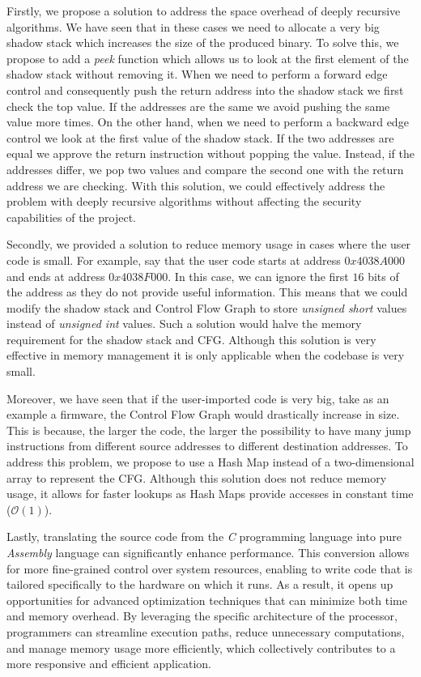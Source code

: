 Firstly, we propose a solution to address the space overhead of deeply recursive
algorithms. We have seen that in these cases we need to allocate a very big shadow
stack which increases the size of the produced binary. To solve this, we propose
to add a \textit{peek} function which allows us to look at the first element of
the shadow stack without removing it. When we need to perform a forward edge control
and consequently push the return address into the shadow stack we first check the
top value. If the addresses are the same we avoid pushing the same value more
times. On the other hand, when we need to perform a backward edge control we
look at the first value of the shadow stack. If the two addresses are equal we approve
the return instruction without popping the value. Instead, if the addresses differ,
we pop two values and compare the second one with the return address we are
checking. With this solution, we could effectively address the problem with
deeply recursive algorithms without affecting the security capabilities of the
project.

Secondly, we provided a solution to reduce memory usage in cases where the user code
is small. For example, say that the user code starts at address $0x4038A000$ and
ends at address $0x4038F000$. In this case, we can ignore the first $16$ bits of
the address as they do not provide useful information. This means that we could
modify the shadow stack and Control Flow Graph to store \textit{unsigned short} values
instead of \textit{unsigned int} values. Such a solution would halve the memory requirement
for the shadow stack and CFG. Although this solution is very effective in memory
management it is only applicable when the codebase is very small.

Moreover, we have seen that if the user-imported code is very big, take as an
example a firmware, the Control Flow Graph would drastically increase in size.
This is because, the larger the code, the larger the possibility to have many
jump instructions from different source addresses to different destination
addresses. To address this problem, we propose to use a Hash Map instead of a
two-dimensional array to represent the CFG. Although this solution does not reduce
memory usage, it allows for faster lookups as Hash Maps provide accesses in
constant time ($\mathcal{O}(1)$).

Lastly, translating the source code from the \textit{C} programming language
into pure \textit{Assembly} language can significantly enhance performance. This
conversion allows for more fine-grained control over system resources, enabling to
write code that is tailored specifically to the hardware on which it runs. As a
result, it opens up opportunities for advanced optimization techniques that can minimize
both time and memory overhead. By leveraging the specific architecture of the
processor, programmers can streamline execution paths, reduce unnecessary
computations, and manage memory usage more efficiently, which collectively
contributes to a more responsive and efficient application.

